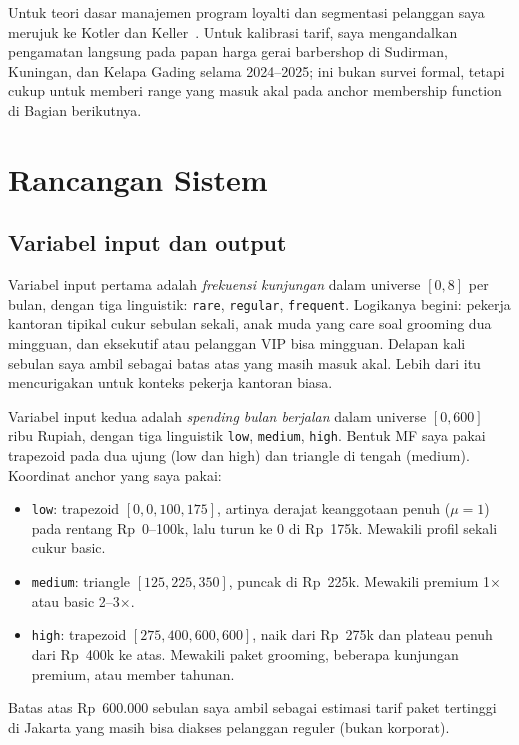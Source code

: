 \documentclass[conference]{IEEEtran}
\begin{document}
Untuk teori dasar manajemen program loyalti dan segmentasi pelanggan
saya merujuk ke Kotler dan Keller~\cite{kotler2016}. Untuk kalibrasi
tarif, saya mengandalkan pengamatan langsung pada papan harga gerai
barbershop di Sudirman, Kuningan, dan Kelapa Gading selama 2024--2025;
ini bukan survei formal, tetapi cukup untuk memberi range yang masuk
akal pada anchor membership function di Bagian berikutnya.

\section{Rancangan Sistem}
\label{sec:design}

\subsection{Variabel input dan output}

Variabel input pertama adalah \emph{frekuensi kunjungan} dalam universe
$[0, 8]$ per bulan, dengan tiga linguistik: \texttt{rare}, \texttt{regular},
\texttt{frequent}. Logikanya begini: pekerja kantoran tipikal cukur sebulan
sekali, anak muda yang care soal grooming dua mingguan, dan eksekutif atau
pelanggan VIP bisa mingguan. Delapan kali sebulan saya ambil sebagai batas
atas yang masih masuk akal. Lebih dari itu mencurigakan untuk konteks
pekerja kantoran biasa.

Variabel input kedua adalah \emph{spending bulan berjalan} dalam universe
$[0, 600]$ ribu Rupiah, dengan tiga linguistik \texttt{low},
\texttt{medium}, \texttt{high}. Bentuk MF saya pakai trapezoid pada dua
ujung (low dan high) dan triangle di tengah (medium). Koordinat
anchor yang saya pakai:
\begin{itemize}
\item \texttt{low}: trapezoid $[0, 0, 100, 175]$, artinya derajat
keanggotaan penuh ($\mu=1$) pada rentang Rp~0--100k, lalu turun ke 0
di Rp~175k. Mewakili profil sekali cukur basic.
\item \texttt{medium}: triangle $[125, 225, 350]$, puncak di Rp~225k.
Mewakili premium 1$\times$ atau basic 2--3$\times$.
\item \texttt{high}: trapezoid $[275, 400, 600, 600]$, naik dari
Rp~275k dan plateau penuh dari Rp~400k ke atas. Mewakili paket
grooming, beberapa kunjungan premium, atau member tahunan.
\end{itemize}
Batas atas Rp~600.000 sebulan saya ambil sebagai estimasi tarif paket
tertinggi di Jakarta yang masih bisa diakses pelanggan reguler (bukan
korporat).
\end{document}
